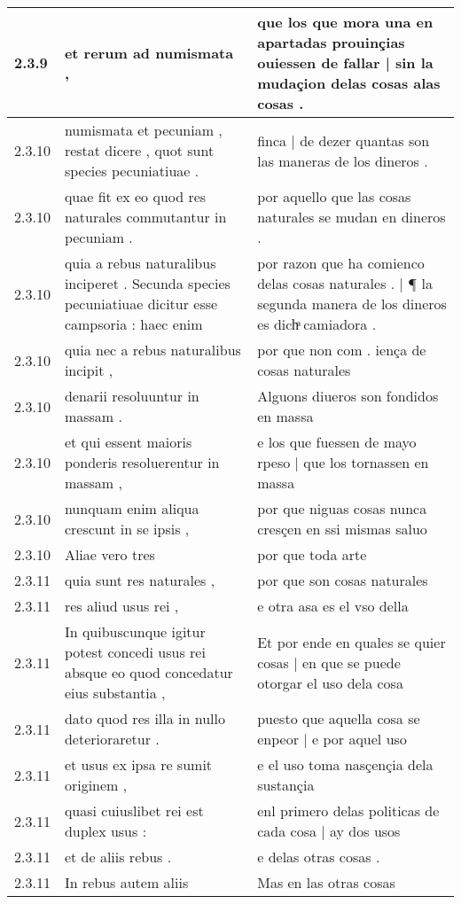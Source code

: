 \begin{tabular}{|p{1cm}|p{6.5cm}|p{6.5cm}|}
2.3.9 & et rerum ad numismata , & que los que mora una en apartadas prouinçias ouiessen de fallar | sin la mudaçion delas cosas alas cosas . \\\hline
2.3.10 & numismata et pecuniam , restat dicere , quot sunt species pecuniatiuae . & finca | de dezer quantas son las maneras de los dineros . \\\hline
2.3.10 & quae fit ex eo quod res naturales commutantur in pecuniam . & por aquello que las cosas naturales se mudan en dineros . \\\hline
2.3.10 & quia a rebus naturalibus inciperet . Secunda species pecuniatiuae dicitur esse campsoria : haec enim & por razon que ha comienco delas cosas naturales . | ¶ la segunda manera de los dineros es dichͣ camiadora . \\\hline
2.3.10 & quia nec a rebus naturalibus incipit , & por que non com . iença de cosas naturales \\\hline
2.3.10 & denarii resoluuntur in massam . & Alguons diueros son fondidos en massa \\\hline
2.3.10 & et qui essent maioris ponderis resoluerentur in massam , & e los que fuessen de mayo rpeso | que los tornassen en massa \\\hline
2.3.10 & nunquam enim aliqua crescunt in se ipsis , & por que niguas cosas nunca cresçen en ssi mismas saluo \\\hline
2.3.10 & Aliae vero tres & por que toda arte \\\hline
2.3.11 & quia sunt res naturales , & por que son cosas naturales \\\hline
2.3.11 & res aliud usus rei , & e otra asa es el vso della \\\hline
2.3.11 & In quibuscunque igitur potest concedi usus rei absque eo quod concedatur eius substantia , & Et por ende en quales se quier cosas | en que se puede otorgar el uso dela cosa \\\hline
2.3.11 & dato quod res illa in nullo deterioraretur . & puesto que aquella cosa se enpeor | e por aquel uso \\\hline
2.3.11 & et usus ex ipsa re sumit originem , & e el uso toma nasçençia dela sustançia \\\hline
2.3.11 & quasi cuiuslibet rei est duplex usus : & enl primero delas politicas de cada cosa | ay dos usos \\\hline
2.3.11 & et de aliis rebus . & e delas otras cosas . \\\hline
2.3.11 & In rebus autem aliis & Mas en las otras cosas \\\hline

\end{tabular}
